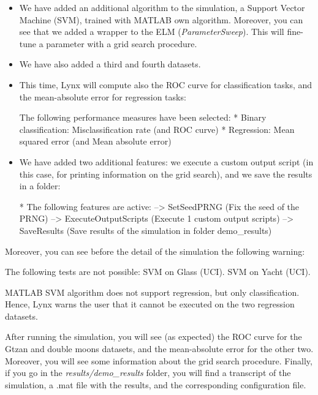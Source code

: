 \begin{itemize}
\item We have added an additional algorithm to the simulation, a Support Vector Machine (SVM), trained with MATLAB own algorithm. Moreover, you can see that we added a wrapper to the ELM (\textit{ParameterSweep}). This will fine-tune a parameter with a grid search procedure.
\item We have also added a third and fourth datasets.
\item This time, Lynx will compute also the ROC curve for classification tasks, and the mean-absolute error for regression tasks:

\begin{console}
The following performance measures have been selected:
	 * Binary classification: Misclassification rate 
	 	(and ROC curve)
	 * Regression: Mean squared error 
	 	(and Mean absolute error)
\end{console}

\item We have added two additional features: we execute a custom output script (in this case, for printing information on the grid search), and we save the results in a folder:

\begin{console}
* The following features are active: 
  --> SetSeedPRNG (Fix the seed of the PRNG) 
  --> ExecuteOutputScripts (Execute 1 custom output scripts) 
  --> SaveResults (Save results of the simulation in folder demo_results) 
\end{console}

\end{itemize}

Moreover, you can see before the detail of the simulation the following warning:

\begin{console}
The following tests are not possible:
   SVM on Glass (UCI).
   SVM on Yacht (UCI).
\end{console}

MATLAB SVM algorithm does not support regression, but only classification. Hence, Lynx warns the user that it cannot be executed on the two regression datasets. 

After running the simulation, you will see (as expected) the ROC curve for the Gtzan and double moons datasets, and the mean-absolute error for the other two. Moreover, you will see some information about the grid search procedure. Finally, if you go in the \textit{results/demo\_results} folder, you will find a transcript of the simulation, a .mat file with the results, and the corresponding configuration file.

